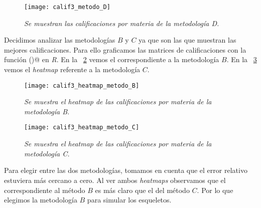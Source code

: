 \begin{figure}[H]
\centering
\texttt{[image: calif3\_metodo\_D]} %
\caption[\textit{Metodología D}]{\textit{Se muestran las calificaciones por materia de la metodología D.}}\label{fig_metodo_D}
\end{figure} 


Decidimos analizar las metodologías $B$ y $C$ ya que son las que muestran las mejores calificaciones. Para ello graficamos las matrices de calificaciones con la función \verb@heatmap()@ en \textit{R}. En la \figurename{~\ref{fig_heatmap_B}} vemos el correspondiente a la metodología $B$. En la \figurename{~\ref{fig_heatmap_C}} vemos el \textit{heatmap} referente a la metodología $C$.

\begin{figure}[H]
\centering
\texttt{[image: calif3\_heatmap\_metodo\_B]} %
\caption[\textit{Heatmap metodología B}]{\textit{Se muestra el heatmap de las calificaciones por materia de la metodología B.}}\label{fig_heatmap_B}
\end{figure}

\begin{figure}[H]
\centering
\texttt{[image: calif3\_heatmap\_metodo\_C]} %
\caption[\textit{Heatmap metodología C}]{\textit{Se muestra el heatmap de las calificaciones por materia de la metodología C.}}\label{fig_heatmap_C}
\end{figure}


Para elegir entre las dos metodologías, tomamos en cuenta que el error relativo estuviera más cercano a cero. Al ver ambos \textit{heatmaps} observamos que el correspondiente al método $B$ es más claro que el del método $C$. Por lo que elegimos la metodología $B$ para simular los esqueletos. %



